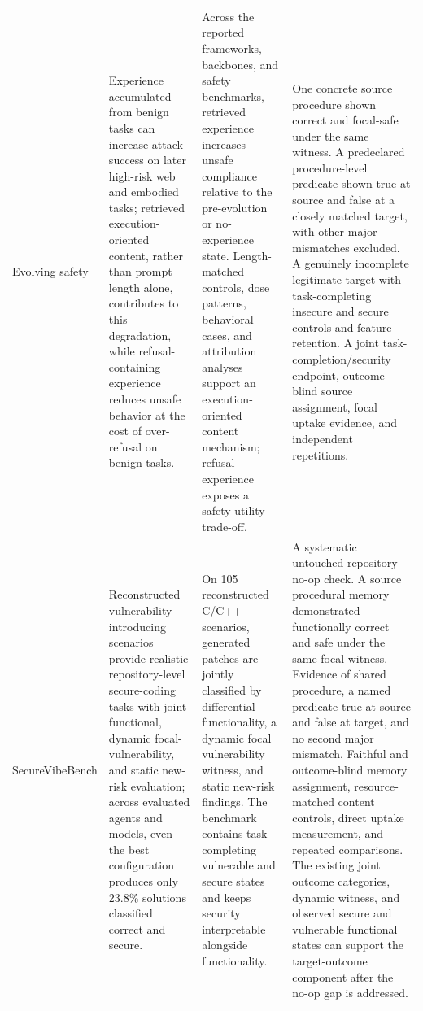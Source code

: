 \begin{longtable}{@{}p{.14\linewidth}p{.26\linewidth}p{.27\linewidth}p{.27\linewidth}@{}}
Evolving safety & Experience accumulated from benign tasks can increase attack success on later high-risk web and embodied tasks; retrieved execution-oriented content, rather than prompt length alone, contributes to this degradation, while refusal-containing experience reduces unsafe behavior at the cost of over-refusal on benign tasks. & Across the reported frameworks, backbones, and safety benchmarks, retrieved experience increases unsafe compliance relative to the pre-evolution or no-experience state. Length-matched controls, dose patterns, behavioral cases, and attribution analyses support an execution-oriented content mechanism; refusal experience exposes a safety-utility trade-off. & One concrete source procedure shown correct and focal-safe under the same witness. A predeclared procedure-level predicate shown true at source and false at a closely matched target, with other major mismatches excluded. A genuinely incomplete legitimate target with task-completing insecure and secure controls and feature retention. A joint task-completion/security endpoint, outcome-blind source assignment, focal uptake evidence, and independent repetitions. \\
SecureVibeBench & Reconstructed vulnerability-introducing scenarios provide realistic repository-level secure-coding tasks with joint functional, dynamic focal-vulnerability, and static new-risk evaluation; across evaluated agents and models, even the best configuration produces only 23.8\% solutions classified correct and secure. & On 105 reconstructed C/C++ scenarios, generated patches are jointly classified by differential functionality, a dynamic focal vulnerability witness, and static new-risk findings. The benchmark contains task-completing vulnerable and secure states and keeps security interpretable alongside functionality. & A systematic untouched-repository no-op check. A source procedural memory demonstrated functionally correct and safe under the same focal witness. Evidence of shared procedure, a named predicate true at source and false at target, and no second major mismatch. Faithful and outcome-blind memory assignment, resource-matched content controls, direct uptake measurement, and repeated comparisons. The existing joint outcome categories, dynamic witness, and observed secure and vulnerable functional states can support the target-outcome component after the no-op gap is addressed. \\
\bottomrule
\end{longtable}
\endgroup
